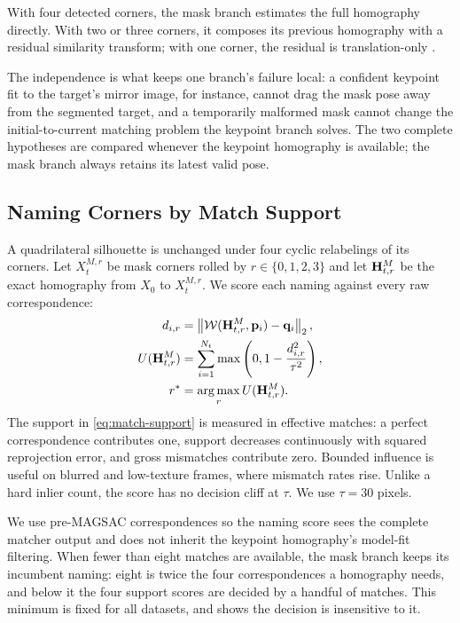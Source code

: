 \documentclass[10pt,twocolumn,letterpaper]{article}
\begin{document}
With four detected corners, the mask branch estimates the full homography directly.
With two or three corners, it composes its previous homography with a residual similarity transform; with one corner, the residual is translation-only \cite{serych2026woftsam}.

The independence is what keeps one branch's failure local: a confident keypoint fit to the target's mirror image, for instance, cannot drag the mask pose away from the segmented target, and a temporarily malformed mask cannot change the initial-to-current matching problem the keypoint branch solves.
The two complete hypotheses are compared whenever the keypoint homography is available; the mask branch always retains its latest valid pose.

\subsection{Naming Corners by Match Support}
\label{sec:match-naming}

A quadrilateral silhouette is unchanged under four cyclic relabelings of its corners.
Let $X_t^{M,r}$ be mask corners rolled by $r\in\{0,1,2,3\}$ and let $\mathbf{H}_{t,r}^{M}$ be the exact homography from $X_0$ to $X_t^{M,r}$.
We score each naming against every raw correspondence:
\begin{align}
    d_{i,r} &= \left\lVert
    \mathcal{W}(\mathbf{H}_{t,r}^{M},\mathbf{p}_i)-\mathbf{q}_i
    \right\rVert_2, \\
    U(\mathbf{H}_{t,r}^{M}) &= \sum_{i=1}^{N_t}
    \max\left(0,1-\frac{d_{i,r}^{2}}{\tau^2}\right),
    \label{eq:match-support}\\
    r^* &= \operatorname*{arg\,max}_r U(\mathbf{H}_{t,r}^{M}).
\end{align}
The support in \cref{eq:match-support} is measured in effective matches: a perfect correspondence contributes one, support decreases continuously with squared reprojection error, and gross mismatches contribute zero.
Bounded influence is useful on blurred and low-texture frames, where mismatch rates rise.
Unlike a hard inlier count, the score has no decision cliff at $\tau$.
We use $\tau=30$ pixels.

We use pre-MAGSAC correspondences so the naming score sees the complete matcher output and does not inherit the keypoint homography's model-fit filtering.
When fewer than eight matches are available, the mask branch keeps its incumbent naming: eight is twice the four correspondences a homography needs, and below it the four support scores are decided by a handful of matches.
This minimum is fixed for all datasets, and  shows the decision is insensitive to it.
\end{document}
